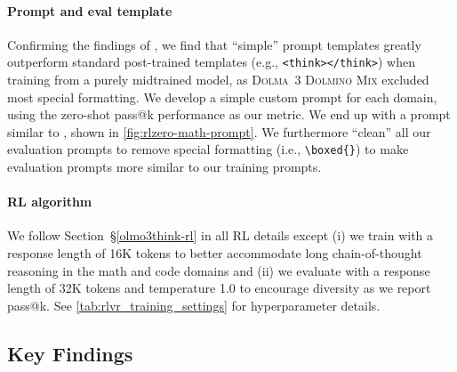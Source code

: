 \documentclass[table]{ai2style/ai2}
\newcommand{\dolminostoo}{\textsc{Dolma~3 Dolmino Mix}\xspace}
\begin{document}
{{\paragraph{Prompt and eval template}
Confirming the findings of \citet{liu2025understanding}, we find that ``simple'' prompt templates greatly outperform standard post-trained templates (e.g., \texttt{<think></think>}) when training from a purely midtrained model, as \dolminostoo excluded most special formatting.
We develop a simple custom prompt for each domain, using the zero-shot pass@k performance as our metric.
We end up with a prompt similar to \citet{yu2025dapo}, shown in \autoref{fig:rlzero-math-prompt}.
We furthermore ``clean'' all our evaluation prompts to remove special formatting (i.e., \texttt{\textbackslash boxed\{\}}) to make evaluation prompts more similar to our training prompts.

\paragraph{RL algorithm} We follow Section~\S\ref{olmo3think-rl} in all RL details except (i) we train with a response length of 16K tokens to better accommodate long chain-of-thought reasoning in the math and code domains and (ii) we evaluate with a response length of 32K tokens and temperature 1.0 to encourage diversity as we report pass@k.
See \autoref{tab:rlvr_training_settings} for hyperparameter details.

\subsection{Key Findings}

}}
\end{document}
